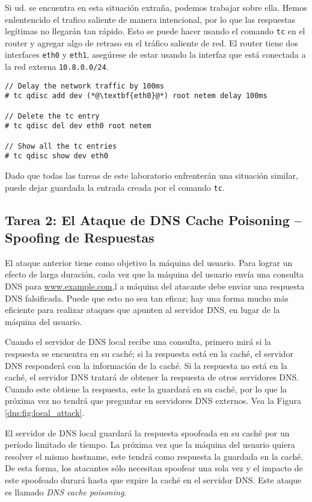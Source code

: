 Si ud. se encuentra en esta situación extraña, podemos trabajar sobre ella. Hemos enlentencido el trafico saliente de manera intencional, por lo que las respuestas legítimas no llegarán tan rápido. Esto se puede hacer usando el comando \texttt{tc} en el router y agregar algo de retraso en el tráfico saliente de red.
El router tiene dos interfaces \texttt{eth0} y  \texttt{eth1}, asegúrese de estar usando la interfaz que está conectada a la red externa \texttt{10.8.0.0/24}.


\begin{lstlisting}
// Delay the network traffic by 100ms
# tc qdisc add dev (*@\textbf{eth0}@*) root netem delay 100ms

// Delete the tc entry
# tc qdisc del dev eth0 root netem

// Show all the tc entries 
# tc qdisc show dev eth0
\end{lstlisting}
 
Dado que todas las tareas de este laboratorio enfrenterán una situación similar, puede dejar guardada la entrada creada por el comando \texttt{tc}.


\subsection{Tarea 2: El Ataque de DNS Cache Poisoning -- Spoofing de Respuestas}

El ataque anterior tiene como objetivo la máquina del usuario. Para lograr un efecto de  larga duración, cada vez que la máquina del usuario envía una consulta DNS para \url{www.example.com},l a máquina del atacante debe enviar una respuesta DNS falsificada.
Puede que esto no sea tan eficaz; hay una forma mucho más eficiente para realizar ataques que apunten al servidor DNS, en lugar de la máquina del usuario.


Cuando el servidor de DNS local recibe una consulta, primero mirá si la respuesta se encuentra en su caché; si la respuesta está en la caché, el servidor DNS responderá con la información de la caché.
Si la respuesta no está en la caché, el servidor DNS tratará de obtener la respuesta de otros servidores DNS. Cuando este obtiene la respuesta, este la guardará en su caché, por lo que la próxima vez no tendrá que preguntar en servidores DNS externos. Vea la Figura \ref{dns:fig:local_attack}. 

El servidor de DNS local guardará la respuesta spoofeada en su caché por un período limitado de tiempo. La próxima vez que la máquina del usuario quiera resolver el mismo hostname, este tendrá como respuesta la guardada en la caché.
De esta forma, los atacantes sólo necesitan spoofear una sola vez y el impacto de este spoofeado durará hasta que expire la caché en el servidor DNS.
Este ataque es llamado {\em DNS cache poisoning}.

